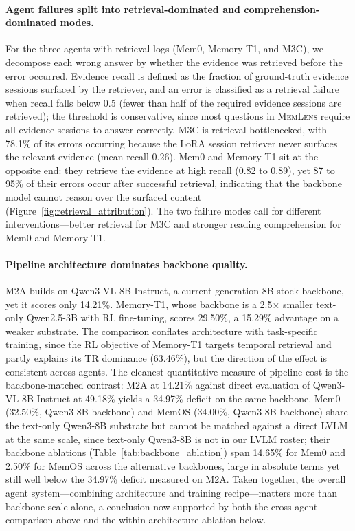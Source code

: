 \documentclass{llmxive}
\providecommand{\bench}{\textsc{MemLens}}
\begin{document}
\paragraph{Agent failures split into retrieval-dominated and comprehension-dominated modes.}
For the three agents with retrieval logs (Mem0, Memory-T1, and M3C), we decompose each wrong answer by whether the evidence was retrieved before the error occurred. Evidence recall is defined as the fraction of ground-truth evidence sessions surfaced by the retriever, and an error is classified as a retrieval failure when recall falls below 0.5 (fewer than half of the required evidence sessions are retrieved); the threshold is conservative, since most questions in \bench{} require all evidence sessions to answer correctly. M3C is retrieval-bottlenecked, with 78.1\% of its errors occurring because the LoRA session retriever never surfaces the relevant evidence (mean recall 0.26). Mem0 and Memory-T1 sit at the opposite end: they retrieve the evidence at high recall (0.82 to 0.89), yet 87 to 95\% of their errors occur after successful retrieval, indicating that the backbone model cannot reason over the surfaced content (Figure~\ref{fig:retrieval_attribution}). The two failure modes call for different interventions---better retrieval for M3C and stronger reading comprehension for Mem0 and Memory-T1.

\paragraph{Pipeline architecture dominates backbone quality.}
M2A builds on Qwen3-VL-8B-Instruct, a current-generation 8B stock backbone, yet it scores only 14.21\%. Memory-T1, whose backbone is a 2.5$\times$ smaller text-only Qwen2.5-3B with RL fine-tuning, scores 29.50\%, a 15.29\% advantage on a weaker substrate. The comparison conflates architecture with task-specific training, since the RL objective of Memory-T1 targets temporal retrieval and partly explains its TR dominance (63.46\%), but the direction of the effect is consistent across agents. The cleanest quantitative measure of pipeline cost is the backbone-matched contrast: M2A at 14.21\% against direct evaluation of Qwen3-VL-8B-Instruct at 49.18\% yields a 34.97\% deficit on the same backbone. Mem0 (32.50\%, Qwen3-8B backbone) and MemOS (34.00\%, Qwen3-8B backbone) share the text-only Qwen3-8B substrate but cannot be matched against a direct LVLM at the same scale, since text-only Qwen3-8B is not in our LVLM roster; their backbone ablations (Table~\ref{tab:backbone_ablation}) span 14.65\% for Mem0 and 2.50\% for MemOS across the alternative backbones, large in absolute terms yet still well below the 34.97\% deficit measured on M2A. Taken together, the overall agent system---combining architecture and training recipe---matters more than backbone scale alone, a conclusion now supported by both the cross-agent comparison above and the within-architecture ablation below.
\end{document}
